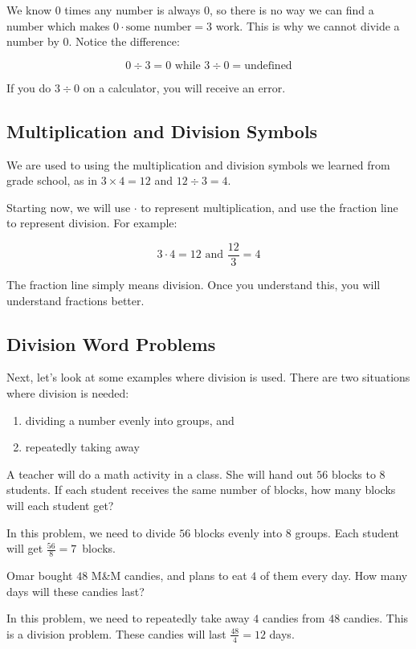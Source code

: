 We know $0$ times any number is always $0$, so there is no way we can find a number which makes $0 \cdot \text{some number} = 3$ work. This is why we cannot divide a number by $0$. Notice the difference:

\[
0 \div 3 = 0 \text{ while } 3 \div 0 = \text{undefined}
\]

If you do $3 \div 0$ on a calculator, you will receive an error.

\subsection{Multiplication and Division Symbols}
We are used to using the multiplication and division symbols we learned from grade school, as in $3 \times 4 = 12$ and $12 \div 3 = 4$.

Starting now, we will use $\cdot$ to represent multiplication, and use the fraction line to represent division. For example:

\[ 3 \cdot 4 = 12 \text{ and } \frac{12}{3}=4 \]

The fraction line simply means division. Once you understand this, you will understand fractions better.

\subsection{Division Word Problems}
Next, let's look at some examples where division is used. There are two situations where division is needed:
\begin{enumerate}
  \item dividing a number evenly into groups, and
  \item repeatedly taking away
\end{enumerate}

\begin{myexample}
	A teacher will do a math activity in a class. She will hand out $56$ blocks to $8$ students. If each student receives the same number of blocks, how many blocks will each student get?
\label{ex:blockDivision}
\end{myexample}
\begin{solution}
	In this problem, we need to divide $56$ blocks evenly into $8$ groups. Each student will get $\frac{56}{8}=7$\ blocks.
\end{solution}

\begin{myexample}
   Omar bought $48$ M\&M candies, and plans to eat $4$ of them every day. How many days will these candies last?
\label{ex:MMDivision}
\end{myexample}
\begin{solution}
	In this problem, we need to repeatedly take away $4$ candies from $48$ candies. This is a division problem. These candies will last $\frac{48}{4}=12$ days.
\end{solution}

